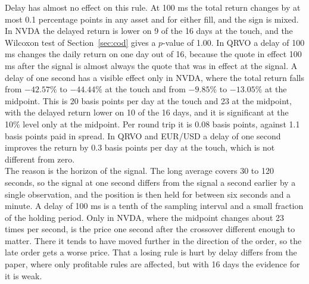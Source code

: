 \documentclass{article}
\begin{document}
\noindent Delay has almost no effect on this rule. At 100 ms the total return changes by at most 0.1 percentage points in any asset and for either fill, and the sign is mixed. In NVDA the delayed return is lower on 9 of the 16 days at the touch, and the Wilcoxon test of Section~\ref{sec:cod} gives a $p$-value of 1.00. In QRVO a delay of 100 ms changes the daily return on one day out of 16, because the quote in effect 100 ms after the signal is almost always the quote that was in effect at the signal. A delay of one second has a visible effect only in NVDA, where the total return falls from $-42.57\%$ to $-44.44\%$ at the touch and from $-9.85\%$ to $-13.05\%$ at the midpoint. This is 20 basis points per day at the touch and 23 at the midpoint, with the delayed return lower on 10 of the 16 days, and it is significant at the 10\% level only at the midpoint. Per round trip it is 0.08 basis points, against 1.1 basis points paid in spread. In QRVO and EUR/USD a delay of one second improves the return by 0.3 basis points per day at the touch, which is not different from zero.\\

\noindent The reason is the horizon of the signal. The long average covers 30 to 120 seconds, so the signal at one second differs from the signal a second earlier by a single observation, and the position is then held for between six seconds and a minute. A delay of 100 ms is a tenth of the sampling interval and a small fraction of the holding period. Only in NVDA, where the midpoint changes about 23 times per second, is the price one second after the crossover different enough to matter. There it tends to have moved further in the direction of the order, so the late order gets a worse price. That a losing rule is hurt by delay differs from the paper, where only profitable rules are affected, but with 16 days the evidence for it is weak.
\end{document}

